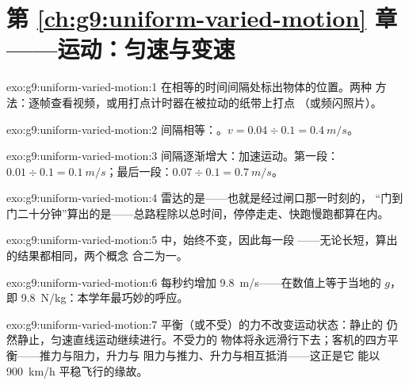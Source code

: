 \section*{第 \ref{ch:g9:uniform-varied-motion} 章——运动：匀速与变速}

\begin{solution}{exo:g9:uniform-varied-motion:1}
在相等的时间间隔处标出物体的位置。两种
方法：逐帧查看视频，或用打点计时器在被拉动的纸带上打点
（或频闪照片）。
\end{solution}

\begin{solution}{exo:g9:uniform-varied-motion:2}
间隔相等：。$v = 0.04 \div 0.1 = \qty{0.4}{m/s}$。
\end{solution}

\begin{solution}{exo:g9:uniform-varied-motion:3}
间隔逐渐增大：加速运动。第一段：$0.01 \div 0.1 =
\qty{0.1}{m/s}$；最后一段：$0.07 \div 0.1 = \qty{0.7}{m/s}$。
\end{solution}

\begin{solution}{exo:g9:uniform-varied-motion:4}
雷达的是——也就是经过闸口那一时刻的，
“门到门二十分钟”算出的是——总路程除以总时间，停停走走、快跑慢跑都算在内。
\end{solution}

\begin{solution}{exo:g9:uniform-varied-motion:5}
中，始终不变，因此每一段
——无论长短，算出的结果都相同，两个概念
合二为一。
\end{solution}

\begin{solution}{exo:g9:uniform-varied-motion:6}
每秒约增加 \qty{9.8}{m/s}——在数值上等于当地的
$g$，即 \qty{9.8}{N/kg}：本学年最巧妙的呼应。
\end{solution}

\begin{solution}{exo:g9:uniform-varied-motion:7}
平衡（或不受）的力不改变运动状态：静止的
仍然静止，匀速直线运动继续进行。不受力的
物体将永远滑行下去；客机的四方平衡——推力与阻力，升力与
阻力与推力、升力与相互抵消——这正是它
能以 \qty{900}{km/h} 平稳飞行的缘故。
\end{solution}

